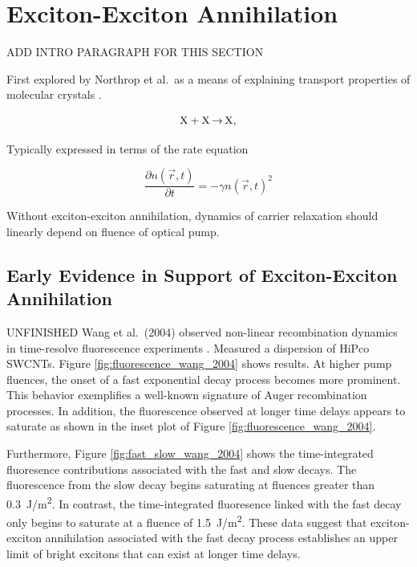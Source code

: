 \section{Exciton-Exciton Annihilation}



{\color{red} ADD INTRO PARAGRAPH FOR THIS SECTION}

First explored by Northrop et al.\ as a means of explaining transport properties of molecular crystals \cite{northrop1958electronic}.

\begin{equation}
\label{eq:exc_annih}
\ce{X + X $\rightarrow$ X},
\end{equation}

Typically expressed in terms of the rate equation

\begin{equation}
	\frac{\partial n(\vec{r}, t)}{\partial t} = - \gamma n(\vec{r}, t)^2
\end{equation}

Without exciton-exciton annihilation, dynamics of carrier relaxation should linearly depend on fluence of optical pump.

\subsection{Early Evidence in Support of Exciton-Exciton Annihilation}
{\color{red} UNFINISHED}
Wang et al.\ (2004) observed non-linear recombination dynamics in time-resolve fluorescence experiments \cite{wang2004observation}. Measured a dispersion of HiPco SWCNTs. Figure \ref{fig:fluorescence_wang_2004} shows results. At higher pump fluences, the onset of a fast exponential decay process becomes more prominent. This behavior exemplifies a well-known signature of Auger recombination processes. In addition, the fluorescence observed at longer time delays appears to saturate as shown in the inset plot of Figure \ref{fig:fluorescence_wang_2004}.



Furthermore, Figure \ref{fig:fast_slow_wang_2004} shows the time-integrated fluoresence contributions associated with the fast and slow decays. The fluorescence from the slow decay begins saturating at fluences greater than \SI{0.3}{\joule / \meter\squared}. In contrast, the time-integrated fluoresence linked with the fast decay only begins to saturate at a fluence of \SI{1.5}{\joule / \meter\squared}. These data suggest that exciton-exciton annihilation associated with the fast decay process establishes an upper limit of bright excitons that can exist at longer time delays.

